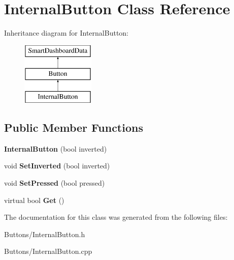 \hypertarget{classInternalButton}{
\section{InternalButton Class Reference}
\label{classInternalButton}
}
Inheritance diagram for InternalButton:\begin{figure}[H]
\begin{center}
\leavevmode
\includegraphics[height=3.000000cm]{classInternalButton}
\end{center}
\end{figure}
\subsection*{Public Member Functions}
\begin{DoxyCompactItemize}
\item 
\hypertarget{classInternalButton_aac2556ed5c9ed51756e63091f00003e4}{
{\bfseries InternalButton} (bool inverted)}
\label{classInternalButton_aac2556ed5c9ed51756e63091f00003e4}

\item 
\hypertarget{classInternalButton_a37a3039f29e33959d4a4e6c705cf4a3c}{
void {\bfseries SetInverted} (bool inverted)}
\label{classInternalButton_a37a3039f29e33959d4a4e6c705cf4a3c}

\item 
\hypertarget{classInternalButton_a51175a152316c7f02df5d691ff737abc}{
void {\bfseries SetPressed} (bool pressed)}
\label{classInternalButton_a51175a152316c7f02df5d691ff737abc}

\item 
\hypertarget{classInternalButton_a24446036153296563419ef446d0390b6}{
virtual bool {\bfseries Get} ()}
\label{classInternalButton_a24446036153296563419ef446d0390b6}

\end{DoxyCompactItemize}


The documentation for this class was generated from the following files:\begin{DoxyCompactItemize}
\item 
Buttons/InternalButton.h\item 
Buttons/InternalButton.cpp\end{DoxyCompactItemize}
